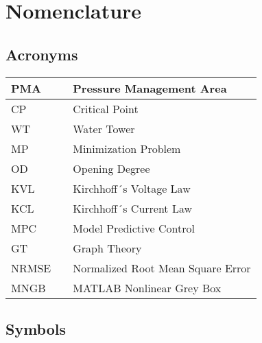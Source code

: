 \chapter{Nomenclature}

\section*{Acronyms}
	
	\begin{tabular}{|l c l|} \hline
		PMA 		&&	Pressure Management Area		\\ \hline
		CP			&&	Critical Point					\\ \hline
		WT			&&	Water Tower						\\ \hline
		MP		  	&&	Minimization Problem			\\ \hline
		OD 			&&  Opening Degree					\\ \hline
		KVL 		&&  Kirchhoff´s Voltage Law 		\\ \hline
		KCL 		&&  Kirchhoff´s Current Law			\\ \hline
		MPC			&&  Model Predictive Control		\\ \hline
		GT			&&  Graph Theory					\\ \hline
		NRMSE	    &&  Normalized Root Mean Square Error	\\ \hline
		MNGB		&&  MATLAB Nonlinear Grey Box	\\ \hline
	\end{tabular}

\section*{Symbols}


